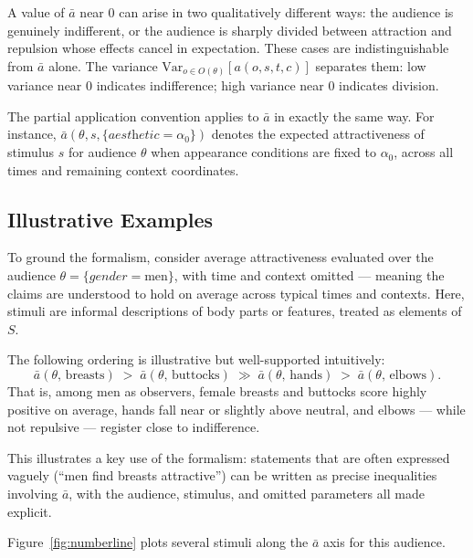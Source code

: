 \begin{remark}
A value of $\bar{a}$ near $0$ can arise in two qualitatively different ways: the audience is genuinely indifferent, or the audience is sharply divided between attraction and repulsion whose effects cancel in expectation.
These cases are indistinguishable from $\bar{a}$ alone.
The variance $\mathrm{Var}_{o \in O(\theta)}[a(o, s, t, c)]$ separates them: low variance near $0$ indicates indifference; high variance near $0$ indicates division.
\end{remark}

The partial application convention applies to $\bar{a}$ in exactly the same way.
For instance, $\bar{a}(\theta, s, \{\textit{aesthetic} = \alpha_0\})$ denotes the expected attractiveness of stimulus $s$ for audience $\theta$ when appearance conditions are fixed to $\alpha_0$, across all times and remaining context coordinates.

\subsection{Illustrative Examples}

To ground the formalism, consider average attractiveness evaluated over the audience $\theta = \{\textit{gender} = \text{men}\}$, with time and context omitted --- meaning the claims are understood to hold on average across typical times and contexts.
Here, stimuli are informal descriptions of body parts or features, treated as elements of $S$.

The following ordering is illustrative but well-supported intuitively:
\[
  \bar{a}(\theta,\, \text{breasts})
  \;>\;
  \bar{a}(\theta,\, \text{buttocks})
  \;\gg\;
  \bar{a}(\theta,\, \text{hands})
  \;>\;
  \bar{a}(\theta,\, \text{elbows}).
\]
That is, among men as observers, female breasts and buttocks score highly positive on average, hands fall near or slightly above neutral, and elbows --- while not repulsive --- register close to indifference.

This illustrates a key use of the formalism: statements that are often expressed vaguely (``men find breasts attractive'') can be written as precise inequalities involving $\bar{a}$, with the audience, stimulus, and omitted parameters all made explicit.

Figure~\ref{fig:numberline} plots several stimuli along the $\bar{a}$ axis for this audience.

